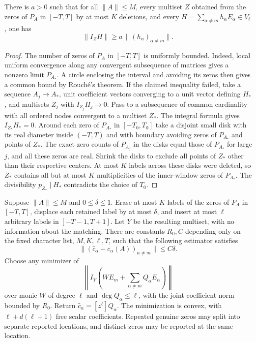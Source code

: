 \begin{lemma}\label{lem:stablefloor}
There is $a>0$ such that for all $\|A\|\le M$, every multiset $Z$ obtained from the zeros of $P_A$ in $[-T,T]$ by at most $K$ deletions, and every $H=\sum_{\alpha\ne m}h_\alpha E_\alpha\in V_\ell$, one has
\[
 \|I_ZH\|\ge a\,\|(h_\alpha)_{\alpha\ne m}\|.
\]
\end{lemma}

\begin{proof}
The number of zeros of $P_A$ in $[-T,T]$ is uniformly bounded. Indeed, local uniform convergence along any convergent subsequence of matrices gives a nonzero limit $P_{A_*}$. A circle enclosing the interval and avoiding its zeros then gives a common bound by Rouch\'e's theorem. If the claimed inequality failed, take a sequence $A_j\to A_*$, unit coefficient vectors converging to a unit vector defining $H_*$, and multisets $Z_j$ with $I_{Z_j}H_j\to0$. Pass to a subsequence of common cardinality with all ordered nodes convergent to a multiset $Z_*$. The integral formula gives $I_{Z_*}H_*=0$. Around each zero of $P_{A_*}$ in $[-T_0,T_0]$ take a disjoint small disk with its real diameter inside $(-T,T)$ and with boundary avoiding zeros of $P_{A_*}$ and points of $Z_*$. The exact zero counts of $P_{A_j}$ in the disks equal those of $P_{A_*}$ for large $j$, and all these zeros are real. Shrink the disks to exclude all points of $Z_*$ other than their respective centers. At most $K$ labels across these disks were deleted, so $Z_*$ contains all but at most $K$ multiplicities of the inner-window zeros of $P_{A_*}$. The divisibility $p_{Z_*}\mid H_*$ contradicts the choice of $T_0$.
\end{proof}

\begin{theorem}\label{thm:stabledecoder}
Suppose $\|A\|\le M$ and $0\le\delta\le1$. Erase at most $K$ labels of the zeros of $P_A$ in $[-T,T]$, displace each retained label by at most $\delta$, and insert at most $\ell$ arbitrary labels in $[-T-1,T+1]$. Let $Y$ be the resulting multiset, with no information about the matching. There are constants $R_0,C$ depending only on the fixed character list, $M,K,\ell,T$, such that the following estimator satisfies
\[
 \big\|(\widehat c_\alpha-c_\alpha(A))_{\alpha\ne m}\big\|\le C\delta .
\]
Choose any minimizer of
\[
 \left\| I_Y\!\left(W E_m+\sum_{\alpha\ne m}Q_\alpha E_\alpha\right)\right\|
\]
over monic $W$ of degree $\ell$ and $\deg Q_\alpha\le\ell$, with the joint coefficient norm bounded by $R_0$. Return $\widehat c_\alpha=[z^\ell]Q_\alpha$. The minimization is convex, with $\ell+d(\ell+1)$ free scalar coefficients. Repeated genuine zeros may split into separate reported locations, and distinct zeros may be reported at the same location.
\end{theorem}

